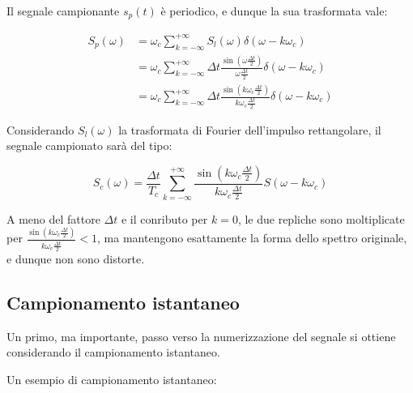 Il segnale campionante $s_p (t)$ è periodico, e dunque la sua trasformata vale: 

{
    \Large 
    \begin{equation}
        \begin{split}
            S_p (\omega) 
            &= 
            \omega_c 
            \sum_{k = -\infty}^{+ \infty}
            S_l (\omega) \delta (\omega - k \omega_c)
            \\ 
            &= 
            \omega_c 
            \sum_{k = -\infty}^{+ \infty}
            \Delta t 
            \frac{\sin(\omega \frac{\Delta t}{2})}{\omega \frac{\Delta t}{2}} 
            \delta (\omega - k \omega_c) 
            \\ 
            &= 
            \omega_c 
            \sum_{k = -\infty}^{+ \infty}
            \Delta t 
            \frac{\sin(k \omega_c \frac{\Delta t}{2})}{k \omega_c \frac{\Delta t}{2}} 
            \delta (\omega - k \omega_c)
        \end{split}
    \end{equation}
}

Considerando $S_l (\omega)$ la trasformata di Fourier dell'impulso rettangolare, il segnale campionato sarà del tipo: 

{
    \Large 
    \begin{equation}
        S_c (\omega) 
        = 
        \frac{\Delta t}{T_c} 
        \sum_{k = -\infty}^{+ \infty} 
        \frac{\sin (k \omega_c \frac{\Delta t}{2})}{k \omega_c \frac{\Delta t}{2}} 
        S(\omega - k \omega_c)
    \end{equation}
}

A meno del fattore $\Delta t$ e il conributo per $k = 0$, 
le due repliche sono moltiplicate per $\frac{\sin (k \omega_c \frac{\Delta t}{2})}{k \omega_c \frac{\Delta t}{2}} < 1$, 
ma mantengono esattamente la forma dello spettro originale, e dunque non sono distorte. \newline 

\newpage 

\subsection{Campionamento istantaneo}

Un primo, ma importante, passo verso la numerizzazione del segnale si ottiene considerando il campionamento istantaneo. \newline 

Un esempio di campionamento istantaneo: 


